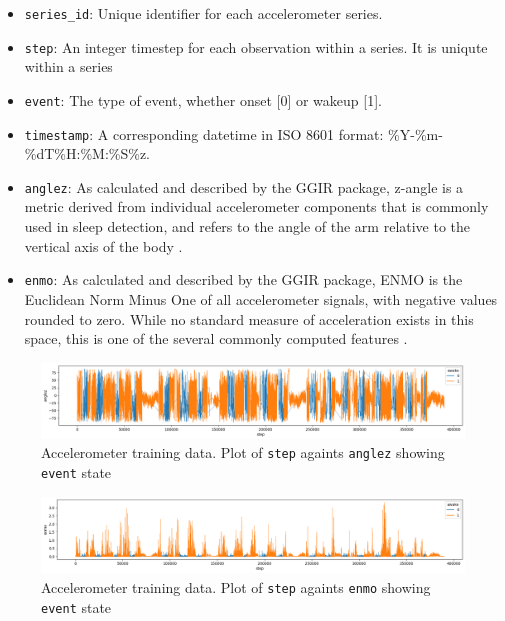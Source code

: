 \documentclass{article}
\begin{document}
 \begin{itemize}
  \item \texttt{series\_id}: Unique identifier for each accelerometer series.
    \item \texttt{step}: An integer timestep for each observation within a series. It is uniqute within a series
  \item \texttt{event}: The type of event, whether onset [0] or wakeup [1].
  \item \texttt{timestamp}: A corresponding datetime in ISO 8601 format: \%Y-\%m-\%dT\%H:\%M:\%S\%z.
  \item \texttt{anglez}: As calculated and described by the GGIR package, z-angle is a metric derived from individual accelerometer components that is commonly used in sleep detection, and refers to the angle of the arm relative to the vertical axis of the body \cite{Migueles2019GGIR}.
  \item \texttt{enmo}: As calculated and described by the GGIR package, ENMO is the Euclidean Norm Minus One of all accelerometer signals, with negative values rounded to zero. While no standard measure of acceleration exists in this space, this is one of the several commonly computed features \cite{Migueles2019GGIR}.
\end{itemize}

 \begin{figure}[ht]
    \centering
    \includegraphics[width=1\linewidth]{figures/038441c925bb_anglez.png}
    \caption{Accelerometer training data. Plot of \texttt{step} againts \texttt{anglez} showing \texttt{event} state}
    \label{fig:accelerometerdata_series-038441c925bb_anglez}
\end{figure}



 \begin{figure}[ht]
    \centering
    \includegraphics[width=1\linewidth]{figures/038441c925bb_enmo.png}
    \caption{Accelerometer training data. Plot of \texttt{step} againts \texttt{enmo} showing \texttt{event} state}
    \label{fig:accelerometerdata_series-038441c925bb_enmo}
\end{figure}
\end{document}
